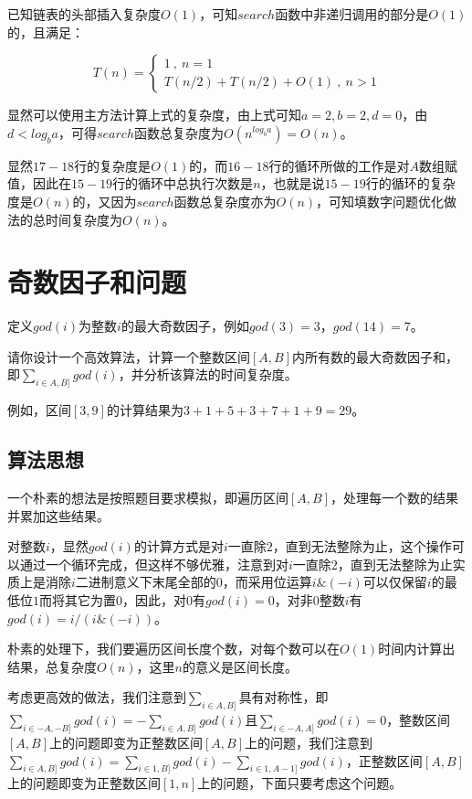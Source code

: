 \documentclass{article}
\begin{document}
已知链表的头部插入复杂度$O(1)$，可知$search$函数中非递归调用的部分是$O(1)$的，且满足：

$$
T(n)=\left\{
\begin{array}{l}
1\ ,\ n=1\\
T(n/2)+T(n/2)+O(1)\ ,\ n>1
\end{array}
\right.
$$

显然可以使用主方法计算上式的复杂度，由上式可知$a=2,b=2,d=0$，由$d<log_b a$，可得$search$函数总复杂度为$O(n^{log_b a})=O(n)$。

显然$17-18$行的复杂度是$O(1)$的，而$16-18$行的循环所做的工作是对$A$数组赋值，因此在$15-19$行的循环中总执行次数是$n$，也就是说$15-19$行的循环的复杂度是$O(n)$的，又因为$search$函数总复杂度亦为$O(n)$，可知填数字问题优化做法的总时间复杂度为$O(n)$。

\section{奇数因子和问题}

定义$god(i)$为整数$i$的最大奇数因子，例如$god(3)=3$，$god(14)=7$。

请你设计一个高效算法，计算一个整数区间$[A,B]$内所有数的最大奇数因子和，即$\sum_{i\in{A},B]}god(i)$，并分析该算法的时间复杂度。

例如，区间$[3,9]$的计算结果为$3+1+5+3+7+1+9=29$。

\subsection{算法思想}

一个朴素的想法是按照题目要求模拟，即遍历区间$[A,B]$，处理每一个数的结果并累加这些结果。

对整数$i$，显然$god(i)$的计算方式是对$i$一直除$2$，直到无法整除为止，这个操作可以通过一个循环完成，但这样不够优雅，注意到对$i$一直除$2$，直到无法整除为止实质上是消除$i$二进制意义下末尾全部的$0$，而采用位运算$i\&(-i)$可以仅保留$i$的最低位$1$而将其它为置$0$，因此，对$0$有$god(i)=0$，对非$0$整数$i$有$god(i)=i/(i\&(-i))$。

朴素的处理下，我们要遍历区间长度个数，对每个数可以在$O(1)$时间内计算出结果，总复杂度$O(n)$，这里$n$的意义是区间长度。

考虑更高效的做法，我们注意到$\sum_{i\in{A},B]}$具有对称性，即$\sum_{i\in{-A},-B]}god(i)=-\sum_{i\in{A},B]}god(i)$且$\sum_{i\in{-A},A]}god(i)=0$，整数区间$[A,B]$上的问题即变为正整数区间$[A,B]$上的问题，我们注意到$\sum_{i\in{A},B]}god(i)=\sum_{i\in{1},B]}god(i)-\sum_{i\in{1},A-1]}god(i)$，正整数区间$[A,B]$上的问题即变为正整数区间$[1,n]$上的问题，下面只要考虑这个问题。
\end{document}
